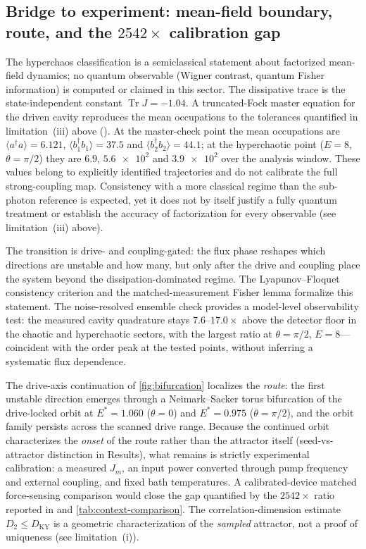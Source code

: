 \documentclass[preprint,numbers,a4paper]{elsarticle}
\newcommand{\Tr}{\operatorname{Tr}}
\begin{document}
\subsection{Bridge to experiment: mean-field boundary, route, and the $\num{2542}\times$ calibration gap}

The hyperchaos classification is a semiclassical statement about factorized mean-field dynamics; no quantum observable (Wigner contrast, quantum Fisher information) is computed or claimed in this sector. The dissipative trace is the state-independent constant $\Tr J=-\num{1.04}$. A truncated-Fock master equation for the driven cavity reproduces the mean occupations to the tolerances quantified in limitation~(iii) above (). At the master-check point the mean occupations are $\langle a^\dagger a\rangle=\num{6.121}$, $\langle b_1^\dagger b_1\rangle=\num{37.5}$ and $\langle b_2^\dagger b_2\rangle=\num{44.1}$; at the hyperchaotic point ($E=\num{8}$, $\theta=\pi/2$) they are $\num{6.9}$, $\num{5.6e2}$ and $\num{3.9e2}$ over the analysis window. These values belong to explicitly identified trajectories and do not calibrate the full strong-coupling map. Consistency with a more classical regime than the sub-photon reference is expected, yet it does not by itself justify a fully quantum treatment or establish the accuracy of factorization for every observable (see limitation~(iii) above).

The transition is drive- and coupling-gated: the flux phase reshapes which directions are unstable and how many, but only after the drive and coupling place the system beyond the dissipation-dominated regime. The Lyapunov--Floquet consistency criterion and the matched-measurement Fisher lemma formalize this statement. The noise-resolved ensemble check provides a model-level observability test: the measured cavity quadrature stays $\num{7.6}$--$\num{17.0}\times$ above the detector floor in the chaotic and hyperchaotic sectors, with the largest ratio at $\theta=\pi/2$, $E=\num{8}$---coincident with the order peak at the tested points, without inferring a systematic flux dependence.

The drive-axis continuation of \cref{fig:bifurcation} localizes the \emph{route}: the first unstable direction emerges through a Neimark--Sacker torus bifurcation of the drive-locked orbit at $E^{*}=\num{1.060}$ ($\theta=0$) and $E^{*}=\num{0.975}$ ($\theta=\pi/2$), and the orbit family persists across the scanned drive range. Because the continued orbit characterizes the \emph{onset} of the route rather than the attractor itself (seed-vs-attractor distinction in Results), what remains is strictly experimental calibration: a measured $J_m$, an input power converted through pump frequency and external coupling, and fixed bath temperatures. A calibrated-device matched force-sensing comparison would close the gap quantified by the $\num{2542}\times$ ratio reported in  and \cref{tab:context-comparison}. The correlation-dimension estimate $D_2\le D_{\mathrm{KY}}$ is a geometric characterization of the \emph{sampled} attractor, not a proof of uniqueness (see limitation~(i)).
\end{document}
